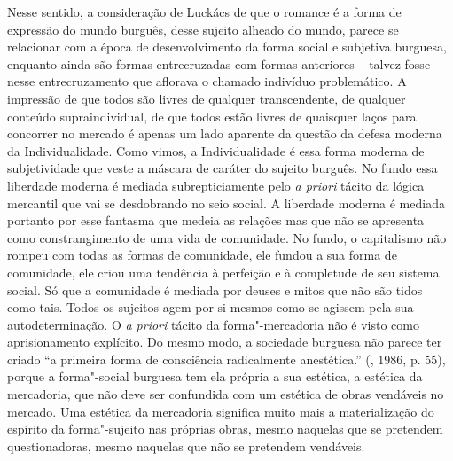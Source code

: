 {Nesse sentido, a consideração de Luckács de que o romance é a forma de
expressão do mundo burguês, desse sujeito alheado do mundo, parece se
relacionar com a época de desenvolvimento da forma social e subjetiva
burguesa, enquanto ainda são formas entrecruzadas com formas anteriores
-- talvez fosse nesse entrecruzamento que aflorava o chamado indivíduo
problemático. A impressão de que todos são livres de qualquer
transcendente, de qualquer conteúdo supraindividual, de que todos estão
livres de quaisquer laços para concorrer no mercado é apenas um lado
aparente da questão da defesa moderna da Individualidade. Como vimos, a
Individualidade é essa forma moderna de subjetividade que veste a
máscara de caráter do sujeito burguês. No fundo essa liberdade moderna é
mediada subrepticiamente pelo \emph{a priori} tácito da lógica mercantil
que vai se desdobrando no seio social. A liberdade moderna é mediada
portanto por esse fantasma que medeia as relações mas que não se
apresenta como constrangimento de uma vida de comunidade. No fundo, o
capitalismo não rompeu com todas as formas de comunidade, ele fundou a
sua forma de comunidade, ele criou uma tendência à perfeição e à
completude de seu sistema social. Só que a comunidade é mediada por
deuses e mitos que não são tidos como tais. Todos os sujeitos agem por
si mesmos como se agissem pela sua autodeterminação. O \emph{a priori}
tácito da forma"-mercadoria não é visto como aprisionamento explícito. Do
mesmo modo, a sociedade burguesa não parece ter criado ``a primeira
forma de consciência radicalmente anestética.'' (, 1986, p. 55),
porque a forma"-social burguesa tem ela própria a sua estética, a
estética da mercadoria, que não deve ser confundida com um estética de
obras vendáveis no mercado. Uma estética da mercadoria significa muito
mais a materialização do espírito da forma"-sujeito nas próprias obras,
mesmo naquelas que se pretendem questionadoras, mesmo naquelas que não
se pretendem vendáveis.

}
